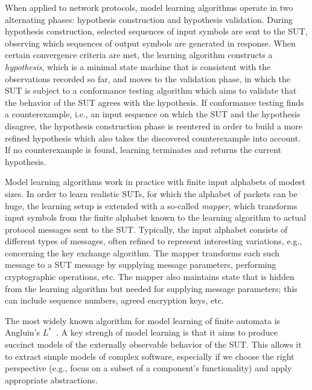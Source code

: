 \documentclass[11pt]{article}
\begin{document}
When applied to network protocols,
model learning algorithms operate in two alternating phases: hypothesis construction and hypothesis validation.
During hypothesis construction, selected sequences of input symbols are sent to the SUT, observing which
sequences of output symbols are generated in response.
When certain convergence criteria are met, the 
learning algorithm constructs a \emph{hypothesis}, which is a minimal state machine that is consistent with
the observations recorded so far, and
moves to the validation phase, in which the SUT is subject to a conformance testing algorithm which aims to validate that
the behavior of the SUT agrees with the hypothesis.
If conformance testing finds a counterexample, i.e., an input sequence on which the SUT and the hypothesis disagree, the
hypothesis construction phase is reentered in order
to build a more refined hypothesis which also takes the discovered
counterexample into account. If no counterexample is found, learning terminates and returns the current hypothesis.

Model learning algorithms work in practice with finite input alphabets of modest sizes. In order to learn realistic SUTs, for which the alphabet of packets can be huge, the learning setup is extended with
a so-called \emph{mapper}, which
transforms input symbols from the finite alphabet known to the learning algorithm to actual protocol
messages sent to the SUT.
Typically, the input alphabet consists of different types of messages, often
refined to represent interesting variations, e.g., concerning the key exchange algorithm.
The mapper transforms each such message to a SUT message by
supplying message parameters, performing cryptographic operations, etc.
The mapper also maintains state that is hidden from the
learning algorithm but needed for supplying message parameters; this can include sequence numbers, agreed encryption keys, etc.

The most widely known algorithm for model learning of finite automata 
is Angluin's $L^*$~\cite{Angluin1987}.
A key strengh of model learning is that it aims to produce succinct models of
the externally observable behavior of the SUT.
%
This allows it to extract simple models of complex software, especially if
we choose the right perspective (e.g., focus on a subset of a component's
functionality) and apply appropriate abstractions.
\end{document}
